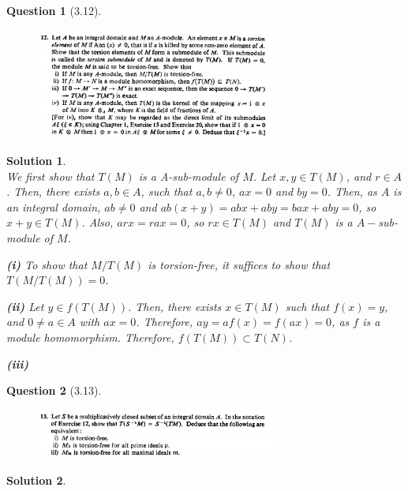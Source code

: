 \documentclass[11pt]{article}
\theoremstyle{plain}
\theoremstyle{quest}
\newtheorem*{question}{Question}
\newtheorem*{solution}{Solution}
\begin{document}
\begin{question}[3.12]
\hfill
\begin{figure}[h!]
  \centering
    \includegraphics[width=0.7\textwidth]{d-3-12.png}
\end{figure}
\end{question}
\begin{solution} \hfill \\
We first show that $T(M)$ is a A-sub-module of $M$. Let $x,y \in T(M)$, and $r \in A$.
Then, there exists $a,b \in A$, such that $a,b \neq 0$, $ax = 0$ and $by = 0$. 
Then, as $A$ is an integral domain, $ab \neq 0$ and
$ab(x+y) = abx + aby = bax + aby = 0$, so $x + y \in T(M)$. Also, $arx = rax = 0$,
so $rx \in T(M)$ and $T(M)$ is a $A-$sub-module of $M$. \\ 

\smallskip

\noindent 
\textbf{(i)} To show that $M/T(M)$ is torsion-free, it suffices to show that
$T(M/T(M)) = 0$.  \\

\smallskip

\noindent
\textbf{(ii)} Let $y \in f(T(M))$. Then, there exists $x \in T(M)$ such that
$f(x) = y$, and $0 \neq a \in A$ with $ax = 0$. Therefore, $ay = af(x) = f(ax) = 0$,
as $f$ is a module homomorphism. Therefore, $f(T(M)) \subset T(N)$. \\ 

\smallskip

\noindent \textbf{(iii)}

\smallskip


\end{solution}

\bigskip

\begin{question}[3.13]
\hfill
\begin{figure}[h!]
  \centering
    \includegraphics[width=0.7\textwidth]{d-3-13.png}
\end{figure}
\end{question}
\begin{solution} \hfill \\
\end{solution}
\end{document}
